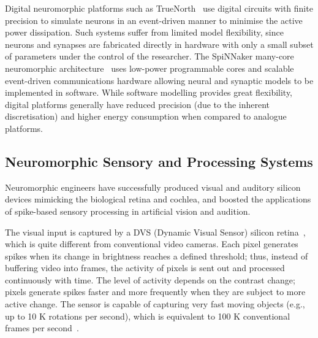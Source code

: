 Digital neuromorphic platforms such as TrueNorth~\citep{merolla2014million} use digital circuits with finite precision to simulate neurons in an event-driven manner to minimise the active power dissipation.
Such systems suffer from limited model flexibility, since neurons and synapses are fabricated directly in hardware with only a small subset of parameters under the control of the researcher.
The SpiNNaker many-core neuromorphic architecture~\citep{furber2014spinnaker} uses low-power programmable cores and scalable event-driven communications hardware allowing neural and synaptic models to be implemented in software.
While software modelling provides great flexibility, digital platforms generally have reduced precision (due to the inherent discretisation) and higher energy consumption when compared to analogue platforms.

\subsection{Neuromorphic Sensory and Processing Systems}
\label{sec:morph}
Neuromorphic engineers have successfully produced visual and auditory silicon devices mimicking the biological retina and cochlea, and boosted the applications of spike-based sensory processing in artificial vision and audition.

The visual input is captured by a DVS (Dynamic Visual Sensor) silicon retina~\DIFdelbegin {}\DIFdelend \DIFaddbegin {}\DIFaddend , which is quite different from conventional video cameras.
Each pixel generates spikes when its change in brightness reaches a defined threshold;
thus, instead of buffering video into frames, the activity of pixels is sent out and processed continuously with time.
\DIFdelbegin {}\DIFdelend %
The level of activity depends on the contrast change; pixels generate spikes faster and more frequently when they are subject to more active change.
The sensor is capable of capturing very fast moving objects (e.g., up to 10 K rotations per second), which is equivalent to 100 K conventional frames per second~\citep{lenero20113}.
\DIFaddbegin {}\DIFaddend 

